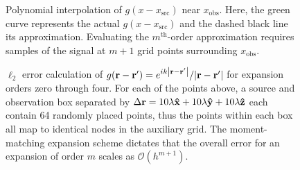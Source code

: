 \begin{figure}
  \centering
  
  \caption{\label{fig:1d moments} Polynomial interpolation of $g(x - x_\text{src})$ near $x_\text{obs}$.
    Here, the green curve represents the actual $g(x - x_\text{src})$ and the dashed black line its approximation.
    Evaluating the $m^\text{th}$-order approximation requires samples of the signal at $m + 1$ grid points surrounding $x_\text{obs}$.
  }
\end{figure}

\begin{figure}
  \centering
  
  \caption{\label{fig:grid convergence} $\ell_2$ error calculation of $g(\vb{r} - \vb{r}') = e^{i k \abs{\vb{r} - \vb{r}'}}/{\abs{\vb{r} - \vb{r}'}}$ for expansion orders zero through four.
    For each of the points above, a source and observation box separated by $\Delta \vb{r} = 10\lambda \vu{x} + 10 \lambda \vu{y} + 10 \lambda \vu{z}$ each contain 64 randomly placed points, thus the points within each box all map to identical nodes in the auxiliary grid.
    The moment-matching expansion scheme dictates that the overall error for an expansion of order $m$ scales as $\mathcal{O}(h^{m + 1})$.
  }
\end{figure}
